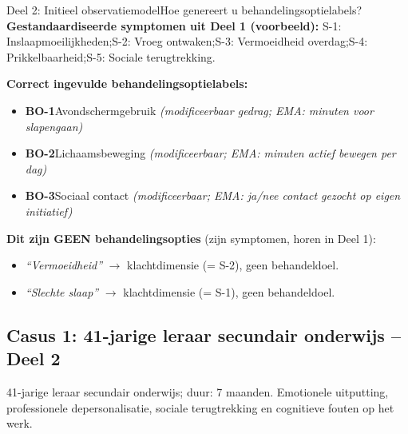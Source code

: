 \documentclass[11pt,a4paper]{article}
\begin{document}
\vspace{0.5em}
\nopagebreak[4]

\begin{voorbeeldbox}{Deel 2: Initieel observatiemodel}{Hoe genereert u behandelingsoptielabels?}
\small
\textbf{Gestandaardiseerde symptomen uit Deel 1 (voorbeeld):}
S-1: Inslaapmoeilijkheden;\enspace S-2: Vroeg ontwaken;\enspace S-3: Vermoeidheid overdag;\enspace S-4: Prikkelbaarheid;\enspace S-5: Sociale terugtrekking.

\medskip
\textbf{Correct ingevulde behandelingsoptielabels:}
\begin{itemize}[topsep=2pt,itemsep=1pt]
\item \textbf{BO-1}\enspace Avondschermgebruik
  \hfill\textit{(modificeerbaar gedrag; EMA: minuten voor slapengaan)}
\item \textbf{BO-2}\enspace Lichaamsbeweging
  \hfill\textit{(modificeerbaar; EMA: minuten actief bewegen per dag)}
\item \textbf{BO-3}\enspace Sociaal contact
  \hfill\textit{(modificeerbaar; EMA: ja/nee contact gezocht op eigen initiatief)}
\end{itemize}

\medskip
\textbf{\color{StrongRed}Dit zijn GEEN behandelingsopties} (zijn symptomen, horen in Deel 1):
\begin{itemize}[topsep=1pt,itemsep=0pt]
\item \textit{``Vermoeidheid''} $\rightarrow$ klachtdimensie (= S-2), geen behandeldoel.
\item \textit{``Slechte slaap''} $\rightarrow$ klachtdimensie (= S-1), geen behandeldoel.
\end{itemize}
\end{voorbeeldbox}

\vspace{0.5em}

\newpage
\subsection*{Casus 1: 41-jarige leraar secundair onderwijs -- Deel 2}

\begin{complaintbox}[title={Casus 1: verkorte klachtomschrijving}]
\small 41-jarige leraar secundair onderwijs; duur: 7 maanden. Emotionele uitputting, professionele depersonalisatie, sociale terugtrekking en cognitieve fouten op het werk.
\end{complaintbox}
\end{document}
